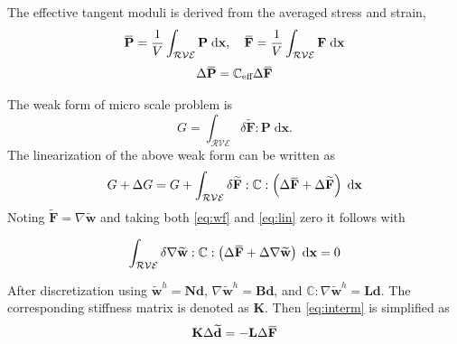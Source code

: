 \documentclass[10pt,a4paper]{scrreprt}
\newcommand{\myd}{\;\mathrm{d}}
\newcommand{\overbar}[1]{\mkern 1.5mu\overline{\mkern-1.5mu#1\mkern-1.5mu}\mkern 1.5mu}
\begin{document}
The effective tangent moduli is derived from the averaged stress and strain,
\begin{equation}
\label{eq:avg}
\overbar{\mathbf{P}} = \dfrac{1}{V} \int_{\mathcal{RVE}} \mathbf{P} \myd{\mathbf{x}}, \quad 
\overbar{\mathbf{F}} = \dfrac{1}{V} \int_{\mathcal{RVE}} \mathbf{F} \myd{\mathbf{x}}
\end{equation}
\begin{equation}
\label{eq:mima}
\Delta \overbar{\mathbf{P}} = \mathbb{C}_{\text{eff}} \Delta \overbar{\mathbf{F}} 
\end{equation}

The weak form of micro scale problem is 
\begin{equation}
\label{eq:wf}
G = \int_{\mathcal{RVE}} \delta \widetilde{\mathbf{F}} : \mathbf{P} \myd{\mathbf{x}}.
\end{equation}
The linearization of the above weak form can be written as 
\begin{equation}
\label{eq:lin}
G + \Delta G = G + \int_{\mathcal{RVE}} \delta \widetilde{\mathbf{F}} : \mathbb{C} : \left( \Delta \overbar{\mathbf{F}} + \Delta \widetilde{\mathbf{F}} \right) \myd{\mathbf{x}}
\end{equation}
Noting $\widetilde{\mathbf{F}} = \nabla{\widetilde{\mathbf{w}}}$ and taking both \eqref{eq:wf} and \eqref{eq:lin} zero it follows with

\begin{equation}
\label{eq:interm}
\int_{\mathcal{RVE}} \delta \nabla{\widetilde{\mathbf{w}}} : \mathbb{C} : \left( \Delta \overbar{\mathbf{F}} + \Delta \nabla{\widetilde{\mathbf{w}}} \right) \myd{\mathbf{x}} = 0
\end{equation}

After discretization using $\widetilde{\mathbf{w}}^{h} = \mathbf{N} \mathbf{d}$, $\nabla \widetilde{\mathbf{w}}^{h} = \mathbf{B} \mathbf{d}$, and $\mathbb{C} : \nabla \widetilde{\mathbf{w}}^{h} = \mathbf{L} \mathbf{d}$. The corresponding stiffness matrix is denoted as $\mathbf{K}$. Then \eqref{eq:interm} is simplified as 
\begin{equation}
\mathbf{K} \Delta \widetilde{\mathbf{d}} = - \mathbf{L} \Delta \overbar{\mathbf{F}}
\end{equation}
\end{document}
